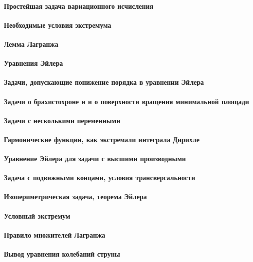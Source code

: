 \documentclass[russian,twocolumn]{article}
\begin{document}
\paragraph{Простейшая задача вариационного исчисления}

\paragraph{Необходимые условия экстремума}

\paragraph{Лемма Лагранжа}

\paragraph{Уравнения Эйлера}

\paragraph{Задачи, допускающие понижение порядка в уравнении Эйлера}

\paragraph{Задачи о брахистохроне и и о поверхности вращения минимальной площади}

\paragraph{Задачи с несколькими переменными}

\paragraph{Гармонические функции, как экстремали интеграла Дирихле}

\paragraph{Уравнение Эйлера для задачи с высшими производными}

\paragraph{Задача с подвижными концами, условия трансверсальности}

\paragraph{Изопериметрическая задача, теорема Эйлера}

\paragraph{Условный экстремум}

\paragraph{Правило множителей Лагранжа}

\paragraph{Вывод уравнения колебаний струны}
\end{document}
